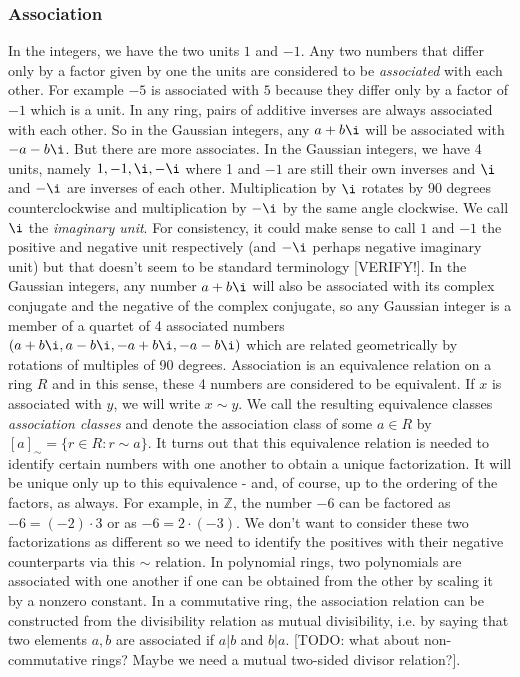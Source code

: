 \subsubsection{Association}
In the integers, we have the two units $1$ and $-1$. Any two numbers that differ only by a factor given by one the units are considered to be \emph{associated} with each other. For example $-5$ is associated with $5$ because they differ only by a factor of $-1$ which is a unit. In any ring, pairs of additive inverses are always associated with each other. So in the Gaussian integers, any $a + b \i$ will be associated with $-a - b \i$. But there are more associates. In the Gaussian integers, we have 4 units, namely $1,-1,\i,-\i$ where 1 and $-1$ are still their own inverses and $\i$ and $-\i$ are inverses of each other. Multiplication by $\i$ rotates by 90 degrees counterclockwise and multiplication by $-\i$ by the same angle clockwise. We call $\i$ the \emph{imaginary unit}. For consistency, it could make sense to call $1$ and $-1$ the positive and negative unit respectively (and $-\i$ perhaps negative imaginary unit) but that doesn't seem to be standard terminology [VERIFY!]. In the Gaussian integers, any number $a + b \i$ will also be associated with its complex conjugate and the negative of the complex conjugate, so any Gaussian integer is a member of a quartet of 4 associated numbers $(a + b\i, a - b \i, -a + b \i, -a - b \i)$ which are related geometrically by rotations of multiples of 90 degrees. Association is an equivalence relation on a ring $R$ and in this sense, these 4 numbers are considered to be equivalent. If $x$ is associated with $y$, we will write $x \sim y$. We call the resulting equivalence classes \emph{association classes} and denote the association class of some $a \in R$ by $[a]_{\sim} = \{r \in R: r \sim a\}$. It turns out that this equivalence relation is needed to identify certain numbers with one another to obtain a unique factorization. It will be unique only up to this equivalence - and, of course, up to the ordering of the factors, as always. For example, in $\mathbb{Z}$, the number $-6$ can be factored as $-6 = (-2) \cdot 3$ or as $-6 = 2 \cdot (-3)$. We don't want to consider these two factorizations as different so we need to identify the positives with their negative counterparts via this $\sim$ relation. In polynomial rings, two polynomials are associated with one another if one can be obtained from the other by scaling it by a nonzero constant. In a commutative ring, the association relation can be constructed from the divisibility relation as mutual divisibility, i.e. by saying that two elements $a,b$ are associated if $a|b$ and $b|a$. [TODO: what about non-commutative rings? Maybe we need a mutual two-sided divisor relation?]. 

